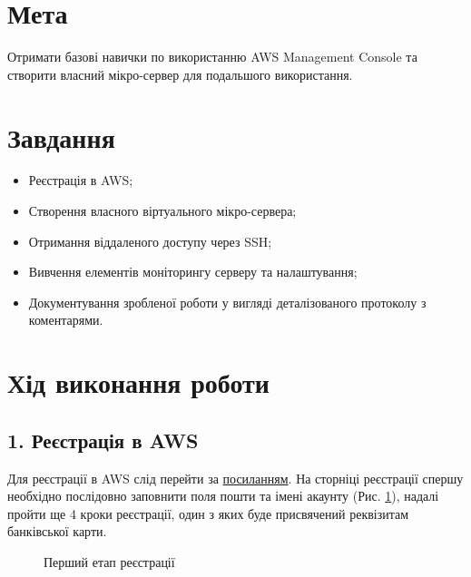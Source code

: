 \documentclass[a4paper,14pt]{extarticle}
\begin{document}



\newpage

\section*{Мета}
Отримати базові навички по використанню AWS Management Console та
створити власний мікро-сервер для подальшого використання.

\section*{Завдання} 

\begin{itemize}
    \item Реєстрація в AWS;
    \item Створення власного віртуального мікро-сервера;
    \item Отримання віддаленого доступу через SSH;
    \item Вивчення елементів моніторингу серверу та налаштування;
    \item Документування зробленої роботи у вигляді деталізованого протоколу з коментарями.
\end{itemize}

\section*{Хід виконання роботи}

\subsection*{1. Реєстрація в AWS}

Для реєстрації в AWS слід перейти за 
\href{https://portal.aws.amazon.com/billing/signup#/start}{посиланням}.
На сторніці реєстрації спершу необхідно послідовно заповнити поля 
пошти та імені акаунту (Рис. \ref{fig:start}), надалі пройти ще 4 кроки 
реєстрації, один з яких буде присвячений реквізитам банківської карти.

\begin{figure}[H]
    \caption{Перший етап реєстрації}
    \label{fig:start}
\end{figure}
\end{document}
